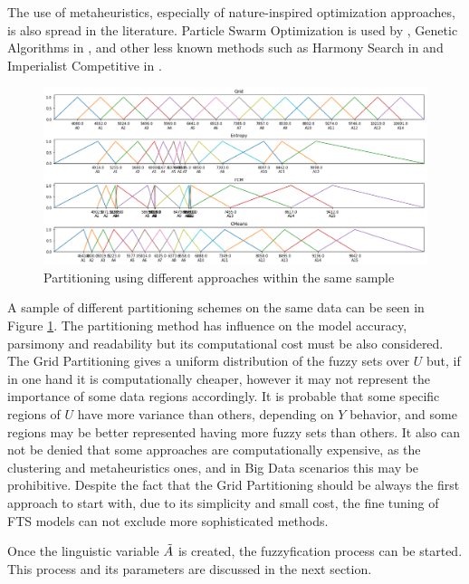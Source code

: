The use of metaheuristics, especially of nature-inspired optimization approaches, is also spread in the literature. Particle Swarm Optimization is used by \cite{Davari2009, Kuo2009, Hsu2010, Huang2011a, Zhang2018a}, Genetic Algorithms in \cite{Chen2006a, Enayatifar2013, Zhang2018}, and other less known methods such as Harmony Search in \cite{Talarposhti2016a, Jiang2017} and Imperialist Competitive in \cite{Sadaei2017}. 

\begin{figure}
    \centering
    \includegraphics[width=\textwidth]{figures/partitioners.png}
    \caption{Partitioning using different approaches within the same sample}
    \label{fig:partitioners}
\end{figure}

A sample of different partitioning schemes on the same data can be seen in Figure \ref{fig:partitioners}. The partitioning method has influence on the model accuracy, parsimony and readability but its computational cost must be also considered. The Grid Partitioning gives a uniform distribution of the fuzzy sets over $U$ but, if in one hand it is computationally cheaper, however it may not represent the importance of some data regions accordingly. It is probable that some specific regions of $U$ have more variance than others, depending on $Y$ behavior, and some regions may be better represented having more fuzzy sets than others. It also can not be denied that some approaches are computationally expensive, as the clustering and metaheuristics ones, and in Big Data scenarios this may be prohibitive. Despite the fact that the Grid Partitioning should be always the first approach to start with, due to its simplicity and small cost, the fine tuning of FTS models can not exclude more sophisticated methods.

Once the linguistic variable $\tilde{A}$ is created, the fuzzyfication process can be started. This process and its parameters are discussed in the next section.



